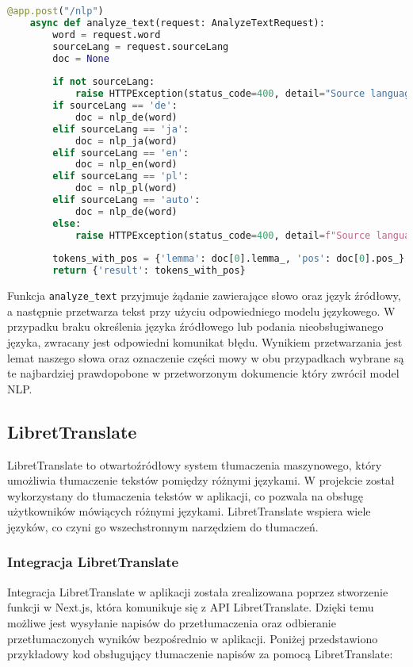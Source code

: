 \begin{lstlisting}[language=Python, caption=kod do obsługi lemmatyzacji i pos taggingu]
    @app.post("/nlp")
    async def analyze_text(request: AnalyzeTextRequest):
        word = request.word
        sourceLang = request.sourceLang
        doc = None
    
        if not sourceLang:
            raise HTTPException(status_code=400, detail="Source language is required")
        if sourceLang == 'de':
            doc = nlp_de(word)
        elif sourceLang == 'ja':
            doc = nlp_ja(word)
        elif sourceLang == 'en':
            doc = nlp_en(word)
        elif sourceLang == 'pl':
            doc = nlp_pl(word)
        elif sourceLang == 'auto':
            doc = nlp_de(word)
        else:
            raise HTTPException(status_code=400, detail=f"Source language is not currently used: {sourceLang}")
        
        tokens_with_pos = {'lemma': doc[0].lemma_, 'pos': doc[0].pos_}
        return {'result': tokens_with_pos}
\end{lstlisting}

Funkcja \texttt{analyze\_text} przyjmuje żądanie zawierające słowo oraz język źródłowy,
a następnie przetwarza tekst przy użyciu odpowiedniego modelu językowego. W przypadku braku określenia języka źródłowego lub podania nieobsługiwanego języka, zwracany jest odpowiedni komunikat błędu.
Wynikiem przetwarzania jest lemat naszego słowa oraz oznaczenie części mowy w obu przypadkach wybrane są te najbardziej prawdopobone w przetworzonym dokumencie który zwrócił model NLP.


\subsection{LibretTranslate}
LibretTranslate to otwartoźródłowy system tłumaczenia maszynowego, który umożliwia tłumaczenie tekstów pomiędzy różnymi językami. W projekcie został wykorzystany do tłumaczenia tekstów w aplikacji, co pozwala na obsługę użytkowników mówiących różnymi językami. LibretTranslate wspiera wiele języków, co czyni go wszechstronnym narzędziem do tłumaczeń.

\subsubsection{Integracja LibretTranslate}
Integracja LibretTranslate w aplikacji została zrealizowana poprzez stworzenie funkcji w Next.js, która komunikuje się z API LibretTranslate. Dzięki temu możliwe jest wysyłanie napisów do przetłumaczenia oraz odbieranie przetłumaczonych wyników bezpośrednio w aplikacji. Poniżej przedstawiono przykładowy kod obsługujący tłumaczenie napisów za pomocą LibretTranslate:

